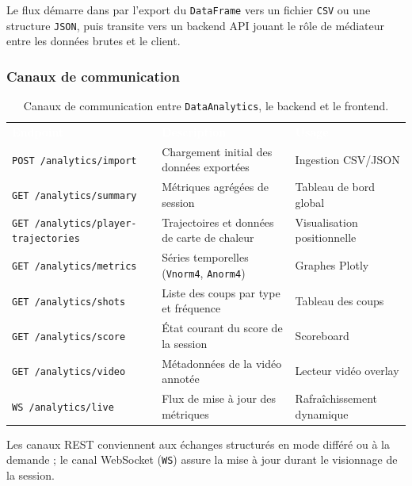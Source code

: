 Le flux démarre dans \smartplayai{} par l'export du \texttt{DataFrame} vers un fichier
\texttt{CSV} ou une structure \texttt{JSON}, puis transite vers un backend API jouant
le rôle de médiateur entre les données brutes et le client.

\subsubsection{Canaux de communication}

\begin{table}[H]
  \centering
  \renewcommand{\arraystretch}{1.3}
  \begin{tabularx}{\textwidth}{L{5cm} X C{3.5cm}}
    \textcolor{white}{\textbf{Endpoint}} &
    \textcolor{white}{\textbf{Description}} &
    \textcolor{white}{\textbf{Usage}} \\
    \texttt{POST /analytics/import} & Chargement initial des données exportées & Ingestion CSV/JSON \\
    \texttt{GET /analytics/summary} & Métriques agrégées de session & Tableau de bord global \\
    \texttt{GET /analytics/player-trajectories} & Trajectoires et données de carte de chaleur & Visualisation positionnelle \\
    \texttt{GET /analytics/metrics} & Séries temporelles (\texttt{Vnorm4}, \texttt{Anorm4}) & Graphes Plotly \\
    \texttt{GET /analytics/shots} & Liste des coups par type et fréquence & Tableau des coups \\
    \texttt{GET /analytics/score} & État courant du score de la session & Scoreboard \\
    \texttt{GET /analytics/video} & Métadonnées de la vidéo annotée & Lecteur vidéo overlay \\
    \texttt{WS /analytics/live} & Flux de mise à jour des métriques & Rafraîchissement dynamique \\
  \end{tabularx}
  \caption{Canaux de communication entre \texttt{DataAnalytics}, le backend et le frontend.}
  \label{tab:endpoints}
\end{table}

Les canaux REST conviennent aux échanges structurés en mode différé ou à la demande ;
le canal WebSocket (\texttt{WS}) assure la mise à jour   durant le
visionnage de la session.

